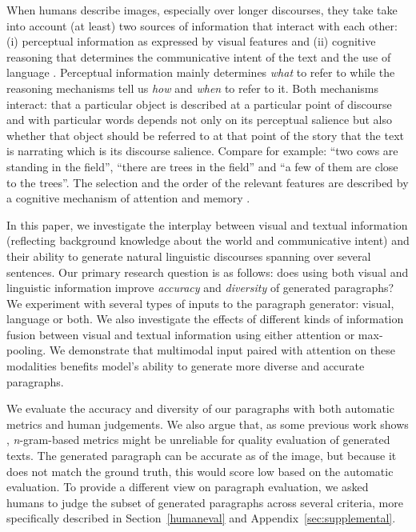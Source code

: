 \documentclass[11pt,a4paper]{article}
\begin{document}
When humans describe images, especially over longer discourses, they take take into account (at least) two sources of information that interact with each other: (i) perceptual information as expressed by visual features and (ii) cognitive reasoning that determines the communicative intent of the text and the use of language \cite{Kelleher:2020aa}.
Perceptual information mainly determines \emph{what} to refer to while the reasoning mechanisms tell us \emph{how} and \emph{when} to refer to it.
Both mechanisms interact: that a particular object is described at a particular point of discourse and with particular words depends not only on its perceptual salience but also whether that object should be referred to at that point of the story that the text is narrating which is its discourse salience.
Compare for example: ``two cows are standing in the field'', ``there are trees in the field'' and ``a few of them are close to the trees''.
The selection and the order of the relevant features are described by a cognitive mechanism of attention and memory \cite{Lavie:2004aa,Dobnik:2016ac}.

In this paper, we investigate the interplay between visual and textual information (reflecting background knowledge about the world and communicative intent) and their ability to generate natural linguistic discourses spanning over several sentences.
Our primary research question is as follows: does %
using both visual and linguistic information improve \emph{accuracy} and \emph{diversity} of generated paragraphs?
We experiment with several types of inputs to the paragraph generator: visual, language or both.
We also investigate the effects of different kinds of information fusion between visual and textual information using either attention or max-pooling. %
We demonstrate that multimodal input paired with attention on these modalities benefits model's ability to generate more diverse and accurate paragraphs.

We evaluate the accuracy and diversity of our paragraphs with both automatic metrics and human judgements.
We also argue that, as some previous work shows \cite{vanderlee2019}, \textit{n}-gram-based metrics might be unreliable for quality evaluation of generated texts.
The generated paragraph can be accurate as of the image, but because it does not match the ground truth, this would score low based on the automatic evaluation.
To provide a different view on paragraph evaluation, we asked humans to judge the subset of generated paragraphs across several criteria, more specifically described in Section~\ref{humaneval} and Appendix~\ref{sec:supplemental}.
\end{document}
